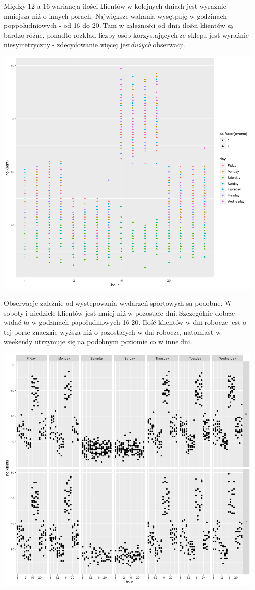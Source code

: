 \documentclass[a4paper,11pt]{article}
\begin{document}
Między 12 a 16 wariancja ilości klientów w kolejnych dniach jest wyraźnie mniejsza niż o innych porach. Największe wahania wysętpuję w godzinach poppołudniowych - od 16 do 20. Tam w zależności od dnia ilości klientów są bardzo różne, ponadto rozkład liczby osób korzystających ze sklepu jest wyraźnie niesymetryczny - zdecydowanie więcej jest\textit{dużych} obserwacji. 

\includegraphics[scale=.7]{plot1.png} 

Obserwacje zależnie od występowania wydarzeń sportowych są podobne. W soboty i niedziele klientów jest mniej niż w pozostałe dni. Szczególnie dobrze widać to w godzinach popołudniowych 16-20.  Ilość klientów w dni robocze jest o tej porze znacznie wyższa niż o pozostałych w dni robocze, natomiast w weekendy  utrzymuje się na podobnym poziomie co w inne dni. 

\includegraphics[scale=.7]{plot2.png} 
\end{document}
